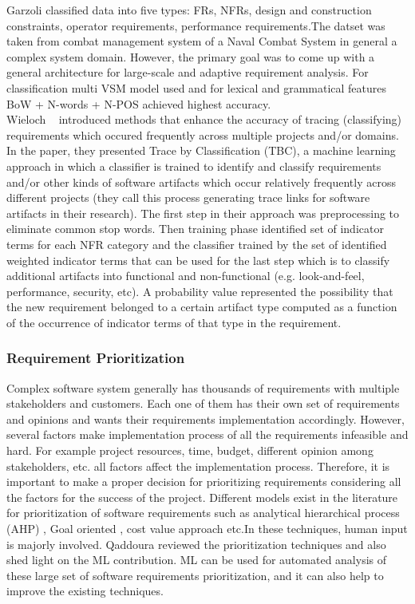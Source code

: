 	Garzoli \cite {Garzoli:2013} classified data into five
types: FRs, NFRs, design and construction constraints, operator requirements,
performance requirements.The datset was taken from combat management system of a
Naval Combat System in general a complex system domain. However, the primary goal
was to come up with a general architecture for large-scale and adaptive
requirement analysis. For classification multi VSM model used and for lexical
and grammatical features BoW + N-words + N-POS achieved highest accuracy.\\

	Wieloch \etal~\cite{Wieloch:2013} introduced methods that enhance the accuracy
of tracing (classifying) requirements which occured frequently across multiple
projects and/or domains. In the paper, they presented Trace by  Classification
(TBC),  a machine learning approach in which a classifier is trained to identify
and classify requirements and/or other kinds of software artifacts which occur
relatively frequently across different projects (they call this process
generating trace links for software artifacts in their research). The first step
in their approach was preprocessing to eliminate common stop words.
Then training phase identified set of indicator terms for each NFR category and the classifier trained by the set of identified
weighted indicator terms that can be used for the last step which is to
classify additional artifacts into functional and non-functional (e.g.
look-and-feel, performance, security, etc). A probability value represented the
possibility that the new requirement belonged to a certain artifact type
computed as a function of the occurrence of indicator terms of that type in the
requirement.\\

\subsubsection{Requirement Prioritization}
Complex software system generally has thousands of requirements with multiple
stakeholders and customers. Each one of them has their own set of requirements
and opinions and wants their requirements implementation accordingly. However,
several factors make implementation process of all the requirements infeasible
and hard. For example project resources, time, budget, different opinion among
stakeholders, etc. all factors affect the implementation process. Therefore, it
is important to make a proper decision for prioritizing requirements considering
all the factors for the success of the project. Different models exist in the
literature for prioritization of software requirements such as analytical
hierarchical process (AHP) \cite{saaty2008}, Goal oriented
\cite{VanLamsweerde:2001}, cost value approach \cite{Karlsson:1997} etc.In these
techniques, human input is majorly involved. Qaddoura \etal \cite{RQaddoura}
reviewed the prioritization techniques and also shed light on the ML
contribution. ML can be used for automated analysis of these large set of
software requirements prioritization, and it can also help to improve the existing techniques.\\

